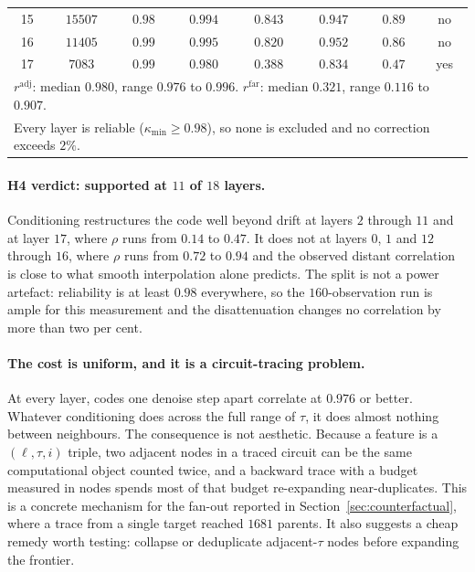 \begin{table}[t]
\begin{center}
\begin{tabular}{ccccccc|c}
15 & $15507$ & $0.98$ & $0.994$ & $0.843$ & $0.947$ & $0.89$ & no \\
16 & $11405$ & $0.99$ & $0.995$ & $0.820$ & $0.952$ & $0.86$ & no \\
17 & $7083$  & $0.99$ & $0.980$ & $0.388$ & $0.834$ & $0.47$ & yes \\
\hline
\multicolumn{8}{l}{$r^{\mathrm{adj}}$: median $0.980$, range $0.976$ to $0.996$. $r^{\mathrm{far}}$: median $0.321$, range $0.116$ to $0.907$.} \\
\multicolumn{8}{l}{Every layer is reliable ($\kappa_{\min}\ge0.98$), so none is excluded and no correction exceeds $2\%$.} \\
\hline
\end{tabular}
\end{center}
\end{table}

\paragraph{H4 verdict: supported at $11$ of $18$ layers.}
Conditioning restructures the code well beyond drift at layers $2$ through $11$
and at layer $17$, where $\rho$ runs from $0.14$ to $0.47$. It does not at
layers $0$, $1$ and $12$ through $16$, where $\rho$ runs from $0.72$ to $0.94$
and the observed distant correlation is close to what smooth interpolation alone
predicts. The split is not a power artefact: reliability is at least $0.98$
everywhere, so the $160$-observation run is ample for this measurement and the
disattenuation changes no correlation by more than two per cent.

\paragraph{The cost is uniform, and it is a circuit-tracing problem.}
At every layer, codes one denoise step apart correlate at $0.976$ or better.
Whatever conditioning does across the full range of $\tau$, it does almost
nothing between neighbours. The consequence is not aesthetic. Because a feature
is a $(\ell,\tau,i)$ triple, two adjacent nodes in a traced circuit can be the
same computational object counted twice, and a backward trace with a budget
measured in nodes spends most of that budget re-expanding near-duplicates. This
is a concrete mechanism for the fan-out reported in
Section~\ref{sec:counterfactual}, where a trace from a single target reached
$1681$ parents. It also suggests a cheap remedy worth testing: collapse or
deduplicate adjacent-$\tau$ nodes before expanding the frontier.

